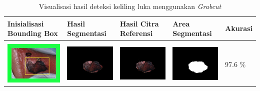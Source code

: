\begin{table}[H]
	\centering
	\caption{Visualisasi hasil deteksi keliling luka menggunakan \emph{Grabcut}}
	\label{tabel_hasil_3}
	\begin{tabular}{|m{1.1in}|m{1.1in}|m{1.1in}|m{1.1in}|m{0.7in}|}
		\hline
		\textbf{Inisialisasi Bounding Box} & \textbf{Hasil Segmentasi} & \textbf{Hasil Citra Referensi} & \textbf{Area Segmentasi} & \textbf{Akurasi} \\
		\hline

		&  &  & \\
		\includegraphics[width=1.1in]{gambar/hasil_segmentasi/luka_hitam/image_19_rect.jpg} \fontsize{8}{12}{(107, 82, 147, 104)}&
		\includegraphics[width=1.1in]{gambar/hasil_segmentasi/luka_hitam/result_19.jpg}&
		\includegraphics[width=1.1in]{gambar/hasil_segmentasi/luka_hitam/result_19_cv.jpg}&
		\includegraphics[width=1.1in]{gambar/hasil_segmentasi/luka_hitam/mask_19.jpg}&
		97.6 \% \\
		\hline
		

\end{tabular}
\end{table}
